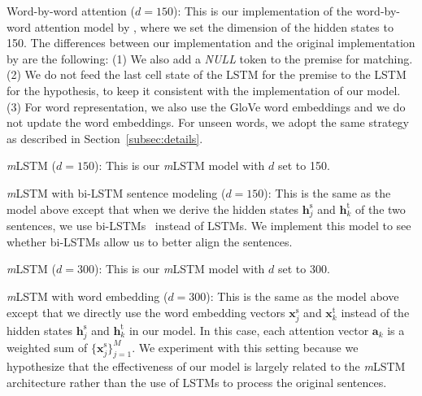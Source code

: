 \documentclass[11pt,letterpaper]{article}
\begin{document}
\begin{compactitem}
	\item Word-by-word attention ($d = 150$): This is our implementation of the word-by-word attention model by , where we set the dimension of the hidden states to 150.
	The differences between our implementation and the original implementation by  are the following: 
	(1) We also add a \emph{NULL} token to the premise for matching.
	(2) We do not feed the last cell state of the LSTM for the premise to the LSTM for the hypothesis, to keep it consistent with the implementation of our model.
	(3) For word representation, we also use the GloVe word embeddings and we do not update the word embeddings.
	For unseen words, we adopt the same strategy as described in Section~\ref{subsec:details}.
	
	\item \emph{m}LSTM ($d = 150$): This is our \emph{m}LSTM model with $d$ set to 150. 
	
	\item \emph{m}LSTM with bi-LSTM sentence modeling ($d = 150$): This is the same as the model above except that when we derive the hidden states $\mathbf{h}^\text{s}_j$ and $\mathbf{h}^\text{t}_k$ of the two sentences, we use bi-LSTMs~\cite{graves2012supervised} instead of LSTMs.
	We implement this model to see whether bi-LSTMs allow us to better align the sentences.
	
	\item \emph{m}LSTM ($d = 300$): This is our \emph{m}LSTM model with $d$ set to 300.
	
	\item \emph{m}LSTM with word embedding ($d = 300$): This is the same as the model above except that we directly use the word embedding vectors $\mathbf{x}^\text{s}_j$ and $\mathbf{x}^\text{t}_k$ instead of the hidden states $\mathbf{h}^\text{s}_j$ and $\mathbf{h}^\text{t}_k$ in our model.
	In this case, each attention vector $\mathbf{a}_k$ is a weighted sum of $\{\mathbf{x}^\text{s}_j\}_{j=1}^M$.
	We experiment with this setting because we hypothesize that the effectiveness of our model is largely related to the \emph{m}LSTM architecture rather than the use of LSTMs to process the original sentences.
	
\end{compactitem}
\end{document}
